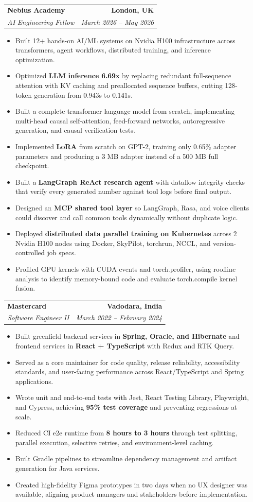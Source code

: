 \documentclass[letterpaper,11pt]{article}
\makeatletter
\newcommand{\resumeItem}[1]{\item\small{{#1 \vspace{-3pt}}}}
\newcommand{\resumeSubheading}[4]{
  \vspace{-3pt}\item
    \begin{tabular*}{1.0\textwidth}[t]{l@{\extracolsep{\fill}}r}
      \textbf{#1} & \textbf{\small #2} \\
      \textit{\small#3} & \textit{\small #4} \\
    \end{tabular*}\vspace{-4pt}
}
\newcommand{\resumeItemListStart}{\begin{itemize}}
\newcommand{\resumeItemListEnd}{\end{itemize}\vspace{0pt}}
\makeatother
\begin{document}
    \resumeSubheading
      {Nebius Academy}{London, UK}
      {AI Engineering Fellow}{March 2026 -- May 2026}
      \resumeItemListStart
        \resumeItem{Built 12+ hands-on AI/ML systems on Nvidia H100 infrastructure across transformers, agent workflows, distributed training, and inference optimization.}
        \resumeItem{Optimized \textbf{LLM inference 6.69x} by replacing redundant full-sequence attention with KV caching and preallocated sequence buffers, cutting 128-token generation from 0.943s to 0.141s.}
        \resumeItem{Built a complete transformer language model from scratch, implementing multi-head causal self-attention, feed-forward networks, autoregressive generation, and causal verification tests.}
        \resumeItem{Implemented \textbf{LoRA} from scratch on GPT-2, training only 0.65\% adapter parameters and producing a 3 MB adapter instead of a 500 MB full checkpoint.}
        \resumeItem{Built a \textbf{LangGraph ReAct research agent} with dataflow integrity checks that verify every generated number against tool logs before final output.}
        \resumeItem{Designed an \textbf{MCP shared tool layer} so LangGraph, Rasa, and voice clients could discover and call common tools dynamically without duplicate logic.}
        \resumeItem{Deployed \textbf{distributed data parallel training on Kubernetes} across 2 Nvidia H100 nodes using Docker, SkyPilot, torchrun, NCCL, and version-controlled job specs.}
        \resumeItem{Profiled GPU kernels with CUDA events and torch.profiler, using roofline analysis to identify memory-bound code and evaluate torch.compile kernel fusion.}
      \resumeItemListEnd

    \resumeSubheading
      {Mastercard}{Vadodara, India}
      {Software Engineer II}{March 2022 -- February 2024}
      \resumeItemListStart
        \resumeItem{Built greenfield backend services in \textbf{Spring, Oracle, and Hibernate} and frontend services in \textbf{React + TypeScript} with Redux and RTK Query.}
        \resumeItem{Served as a core maintainer for code quality, release reliability, accessibility standards, and user-facing performance across React/TypeScript and Spring applications.}
        \resumeItem{Wrote unit and end-to-end tests with Jest, React Testing Library, Playwright, and Cypress, achieving \textbf{95\% test coverage} and preventing regressions at scale.}
        \resumeItem{Reduced CI e2e runtime from \textbf{8 hours to 3 hours} through test splitting, parallel execution, selective retries, and environment-level caching.}
        \resumeItem{Built Gradle pipelines to streamline dependency management and artifact generation for Java services.}
        \resumeItem{Created high-fidelity Figma prototypes in two days when no UX designer was available, aligning product managers and stakeholders before implementation.}
      \resumeItemListEnd
\end{document}
